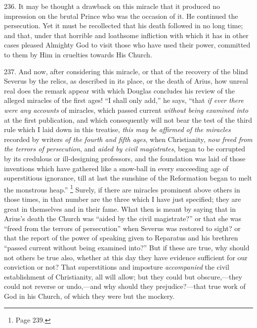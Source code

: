 236.
It may be thought a drawback on this miracle that it produced no
impression on the brutal Prince who was the occasion of it. He
continued the persecution. Yet it must be recollected that his death
followed in no long time; and that, under that horrible and loathsome
infliction with which it has in other cases pleased Almighty God to
visit those who have used their power, committed to them by Him in
cruelties towards His Church.

237.
And now, after considering this miracle, or that of the recovery of
the blind Severus by the relics, as described in its place, or the
death of Arius, how unreal real does the remark appear with
which Douglas concludes his review of the alleged miracles of the
first ages! ``I shall only add,'' he says, ``that \emph{if ever there were
any accounts} of miracles, which passed current \emph{without being
examined into} at the first publication, and which consequently
will not bear the test of the third rule which I laid down in this
treatise, \emph{this may be affirmed of the miracles} recorded by
writers \emph{of the fourth and fifth ages}, when Christianity, \emph{now
freed from the terrors of persecution}, and \emph{aided by civil
magistrates}, began to be corrupted by its credulous or
ill-designing professors, and the foundation was laid of those
inventions which have gathered like a snow-ball in every succeeding
age of superstitious ignorance, till at last the sunshine of the
Reformation began to melt the monstrous heap.'' \footnote{Page 239.} Surely, if there are miracles prominent above others in those
times, in that number are the three which I have just specified; they
are great in themselves and in their fame. What then is meant by
saying that in Arius's death the Church was ``aided by the civil
magistrate?'' or that she was ``freed from the terrors of persecution''
when Severus was restored to sight? or that the report of the power of
speaking given to Reparatus and his brethren ``passed current without
being examined into?'' But if these are true, why should not others be
true also, whether at this day they have evidence sufficient for
our conviction or not? That superstitions and imposture \emph{accompanied}
the civil establishment of Christianity, all will allow; but they
could but obscure,—they could not reverse or undo,—and why should
they prejudice?—that true work of God in his Church, of which they
were but the mockery.


